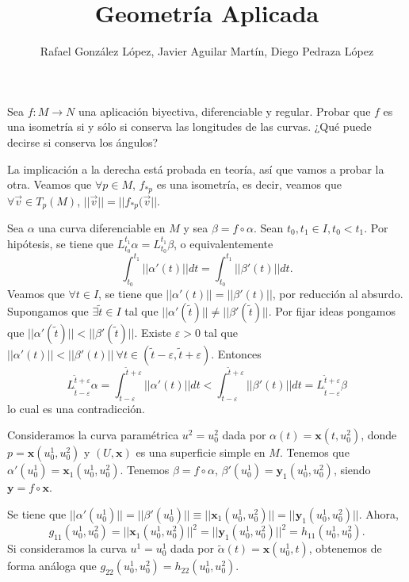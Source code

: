 \documentclass[twoside]{article}
\newcommand{\x}{{\mathbf{x}}}
\newcommand{\y}{{\mathbf{y}}}
\begin{document}
\title{Geometría Aplicada}
\author{Rafael González López, Javier Aguilar Martín, Diego Pedraza López}
\maketitle

\begin{ejercicio}{1.1}
Sea $f : M \to N$ una aplicación biyectiva, diferenciable y regular. Probar que $f$ es una isometría si y sólo si conserva las longitudes de las curvas. ¿Qué puede decirse si conserva los ángulos?
\end{ejercicio}

\begin{solucion}

La implicación a la derecha está probada en teoría, así que vamos a probar la otra. Veamos que $\forall p\in M$, $f_{*p}$ es una isometría, es decir, veamos que $\forall\vec{v}\in T_p(M)$, $||\vec{v}||=||f_{*p}(\vec{v}||$. 

Sea $\alpha$ una curva diferenciable en $M$ y sea $\beta=f\circ\alpha$. Sean $t_0,t_1\in I, t_0<t_1$. Por hipótesis, se tiene que $L^{t_1}_{t_0}\alpha=L^{t_1}_{t_0}\beta$, o equivalentemente
$$\int_{t_0}^{t_1}||\alpha'(t)||dt=\int_{t_0}^{t_1}||\beta'(t)||dt.$$
Veamos que $\forall t\in I$, se tiene que $||\alpha'(t)||=||\beta'(t)||$, por reducción al absurdo. Supongamos que $\exists \tilde{t}\in I$ tal que $||\alpha'(\tilde{t})||\neq||\beta'(\tilde{t})||$. Por fijar ideas pongamos que $||\alpha'(\tilde{t})||<||\beta'(\tilde{t})||$. Existe $\varepsilon>0$ tal que $||\alpha'(t)||<||\beta'(t)||\ \forall t\in (\tilde{t}-\varepsilon,\tilde{t}+\varepsilon)$. Entonces 
$$L^{\tilde{t}+\varepsilon}_{\tilde{t}-\varepsilon}\alpha=\int^{\tilde{t}+\varepsilon}_{\tilde{t}-\varepsilon}||\alpha'(t)||dt<\int^{\tilde{t}+\varepsilon}_{\tilde{t}-\varepsilon}||\beta'(t)||dt=L^{\tilde{t}+\varepsilon}_{\tilde{t}-\varepsilon}\beta$$
lo cual es una contradicción. 

Consideramos la curva paramétrica $u^2=u^2_0$ dada por $\alpha(t)=\x(t,u^2_0)$, donde $p=\x(u^1_0,u^2_0)$ y $(U,\x)$ es una superficie simple en $M$. 
Tenemos que $\alpha'(u_0^1)=\x_1(u^1_0,u^2_0)$. Tenemos $\beta=f\circ\alpha$, $\beta'(u_0^1)=\y_1(u_0^1,u_0^2)$, siendo $\y=f\circ\x$. 

Se tiene que $||\alpha'(u_0^1)||=||\beta'(u_0^1)||\equiv || \x_1(u^1_0,u^2_0)||=||\y_1(u_0^1,u_0^2)||$. Ahora,
$$g_{11}(u_0^1,u_0^2)=|| \x_1(u^1_0,u^2_0)||^2=||\y_1(u_0^1,u_0^2)||^2=h_{11}(u_0^1,u_0^2).$$
Si consideramos la curva $u^1=u^1_0$ dada por $\tilde{\alpha}(t)=\x(u^1_0,t)$, obtenemos de forma análoga que $g_{22}(u_0^1,u_0^2)=h_{22}(u_0^1,u_0^2)$.


\end{solucion}
\end{document}
